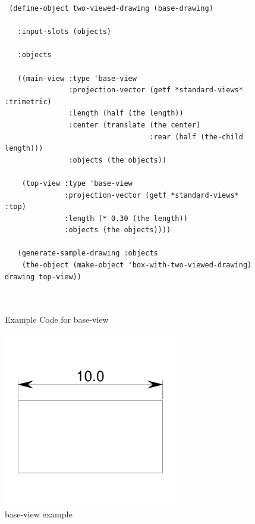 \documentclass [11pt]{book}
\begin{document}
\begin{itemize}
\begin{figure}
\begin{lrbox}{\boxedverb}
\begin{minipage}{\linewidth}
{\begin{verbatim}
 (define-object two-viewed-drawing (base-drawing)
   
   :input-slots (objects)
   
   :objects
  
   ((main-view :type 'base-view
               :projection-vector (getf *standard-views* :trimetric)
               :length (half (the length))
               :center (translate (the center)
                                  :rear (half (the-child length)))
               :objects (the objects))
   
    (top-view :type 'base-view
              :projection-vector (getf *standard-views* :top)
              :length (* 0.30 (the length))
              :objects (the objects))))

   (generate-sample-drawing :objects 
    (the-object (make-object 'box-with-two-viewed-drawing) drawing top-view))
 
 
\end{verbatim}}
\end{minipage}
\end{lrbox}
\fbox{\usebox{\boxedverb}}

\caption{Example Code for base-view}

\label{fig:example-code-base-view}

\end{figure}

\begin{figure}
\begin{center}
\includegraphics[width=3in,height=3in]{../images/example-base-view.pdf}
\end{center}

\caption{base-view example}

\label{fig:base-view}

\end{figure}






\end{itemize}
\end{document}
